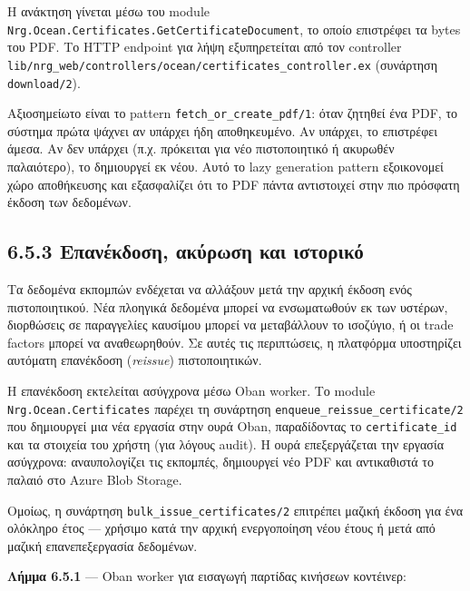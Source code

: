 Η ανάκτηση γίνεται μέσω του module
\texttt{Nrg.Ocean.Certificates.GetCertificateDocument}, το οποίο
επιστρέφει τα bytes του PDF. Το HTTP endpoint για λήψη εξυπηρετείται από
τον controller
\texttt{lib/nrg\_web/controllers/ocean/certificates\_controller.ex}
(συνάρτηση \texttt{download/2}).

Αξιοσημείωτο είναι το pattern \texttt{fetch\_or\_create\_pdf/1}: όταν
ζητηθεί ένα PDF, το σύστημα πρώτα ψάχνει αν υπάρχει ήδη αποθηκευμένο. Αν
υπάρχει, το επιστρέφει άμεσα. Αν δεν υπάρχει (π.χ. πρόκειται για νέο
πιστοποιητικό ή ακυρωθέν παλαιότερο), το δημιουργεί εκ νέου. Αυτό το
lazy generation pattern εξοικονομεί χώρο αποθήκευσης και εξασφαλίζει ότι
το PDF πάντα αντιστοιχεί στην πιο πρόσφατη έκδοση των δεδομένων.

\subsection{6.5.3 Επανέκδοση, ακύρωση και
ιστορικό}\label{ux3b5ux3c0ux3b1ux3bdux3adux3baux3b4ux3bfux3c3ux3b7-ux3b1ux3baux3cdux3c1ux3c9ux3c3ux3b7-ux3baux3b1ux3b9-ux3b9ux3c3ux3c4ux3bfux3c1ux3b9ux3baux3cc}

Τα δεδομένα εκπομπών ενδέχεται να αλλάξουν μετά την αρχική έκδοση ενός
πιστοποιητικού. Νέα πλοηγικά δεδομένα μπορεί να ενσωματωθούν εκ των
υστέρων, διορθώσεις σε παραγγελίες καυσίμου μπορεί να μεταβάλλουν το
ισοζύγιο, ή οι trade factors μπορεί να αναθεωρηθούν. Σε αυτές τις
περιπτώσεις, η πλατφόρμα υποστηρίζει αυτόματη επανέκδοση
(\emph{reissue}) πιστοποιητικών.

Η επανέκδοση εκτελείται ασύγχρονα μέσω Oban worker. Το module
\texttt{Nrg.Ocean.Certificates} παρέχει τη συνάρτηση
\texttt{enqueue\_reissue\_certificate/2} που δημιουργεί μια νέα εργασία
στην ουρά Oban, παραδίδοντας το \texttt{certificate\_id} και τα στοιχεία
του χρήστη (για λόγους audit). Η ουρά επεξεργάζεται την εργασία
ασύγχρονα: αναυπολογίζει τις εκπομπές, δημιουργεί νέο PDF και
αντικαθιστά το παλαιό στο Azure Blob Storage.

Ομοίως, η συνάρτηση \texttt{bulk\_issue\_certificates/2} επιτρέπει
μαζική έκδοση για ένα ολόκληρο έτος --- χρήσιμο κατά την αρχική
ενεργοποίηση νέου έτους ή μετά από μαζική επανεπεξεργασία δεδομένων.

\textbf{Λήμμα 6.5.1} --- Oban worker για εισαγωγή παρτίδας κινήσεων
κοντέινερ:

